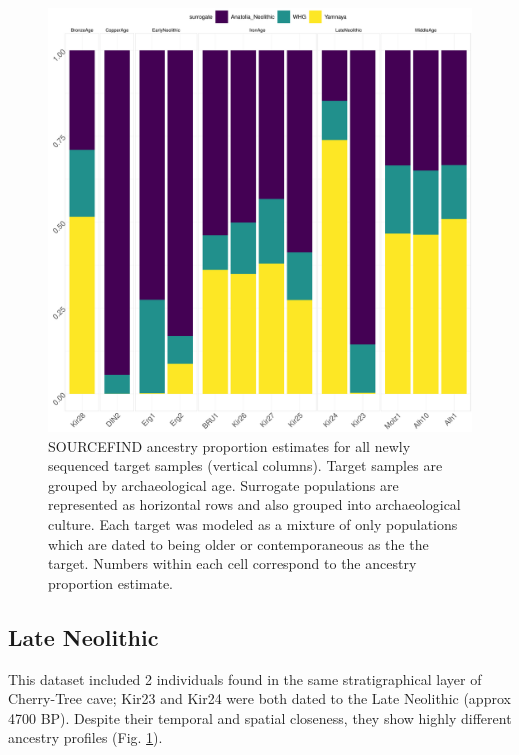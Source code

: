 \begin{figure}[htp]
    \centering
    \includegraphics[width=1.0\textwidth]{../images/chapter4/plots3PopBarlot.pdf}
    \caption{SOURCEFIND ancestry proportion estimates for all newly sequenced target samples (vertical columns). Target samples are grouped by archaeological age. Surrogate populations are represented as horizontal rows and also grouped into archaeological culture. Each target was modeled as a mixture of only populations which are dated to being older or contemporaneous as the the target. Numbers within each cell correspond to the ancestry proportion estimate.}
    \label{fig:plots3PopBarlot}
\end{figure}

\subsection{Late Neolithic}

This dataset included 2 individuals found in the same stratigraphical layer of Cherry-Tree cave; Kir23 and Kir24 were both dated to the Late Neolithic (approx 4700 BP). Despite their temporal and spatial closeness, they show highly different ancestry profiles (Fig. \ref{fig:plots3PopBarlot}). 

